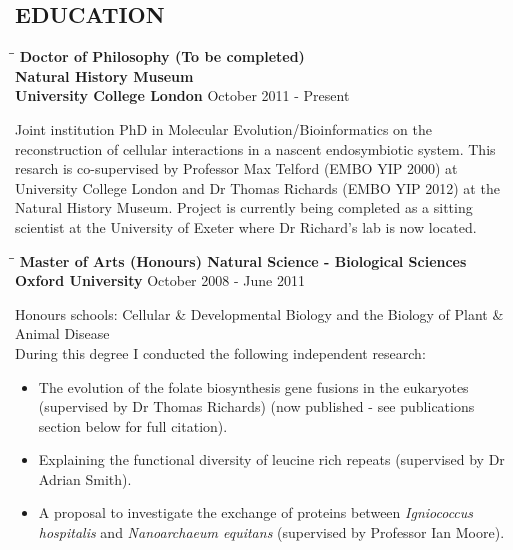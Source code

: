 \documentclass{res}
\begin{document}
\begin{resume}
        
\section{EDUCATION}          

\vspace{-0.05in}
\begin{tabbing}
   \hspace{2in}\= \hspace{2.6in}\= \kill 
    {\bf Doctor of Philosophy (To be completed)}\\ 
    {\bf Natural History Museum}\\
    {\bf University College London
    } \>      \>October 2011 - Present\\

   \end{tabbing}\vspace{-20pt}  
   
   Joint institution PhD in Molecular Evolution/Bioinformatics on the reconstruction of cellular interactions in a nascent endosymbiotic system.  This resarch is co-supervised by Professor Max Telford (EMBO YIP 2000) at University College London and Dr Thomas Richards (EMBO YIP 2012) at the Natural History Museum.  Project is currently being completed as a sitting scientist at the University of Exeter where Dr Richard's lab is now located.

\vspace{-0.1in}
 \begin{tabbing}
   \hspace{2in}\= \hspace{2.6in}\= \kill 
     {\bf Master of Arts (Honours) Natural Science - Biological Sciences}\\
    {\bf Oxford University
    } \>      \>October 2008 - June 2011\\
                          

   \end{tabbing}\vspace{-20pt}  
Honours schools: Cellular \& Developmental Biology and the Biology of Plant \& Animal Disease\\
During this degree I conducted the following independent research:
\begin{itemize}
        \vspace{-10pt}
    \item The evolution of the folate biosynthesis gene fusions in the eukaryotes (supervised by Dr Thomas Richards) (now published - see publications section below for full citation).
    \item Explaining the functional diversity of leucine rich repeats (supervised by Dr Adrian Smith).
    \item A proposal to investigate the exchange of proteins between  \emph{Igniococcus hospitalis} and  \emph{Nanoarchaeum equitans} (supervised by Professor Ian Moore).
\end{itemize}



\end{resume}
\end{document}
